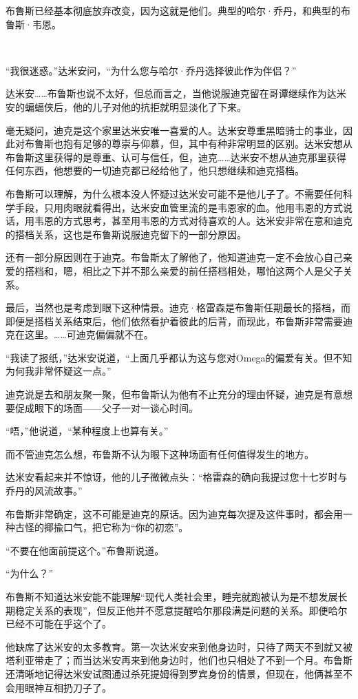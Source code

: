 \documentclass[../main]{subfiles}
\begin{document}
布鲁斯已经基本彻底放弃改变，因为这就是他们。典型的哈尔·乔丹，和典型的布鲁斯·韦恩。

~\

“我很迷惑。”达米安问，“为什么您与哈尔·乔丹选择彼此作为伴侣？”

达米安……布鲁斯也说不太好，但总而言之，当他说服迪克留在哥谭继续作为达米安的蝙蝠侠后，他的儿子对他的抗拒就明显淡化了下来。

毫无疑问，迪克是这个家里达米安唯一喜爱的人。达米安尊重黑暗骑士的事业，因此对布鲁斯也抱有足够的尊崇与仰慕，但，其中有种非常明显的区别。达米安想从布鲁斯这里获得的是尊重、认可与信任，但，迪克……达米安不想从迪克那里获得任何东西，他想要的一切迪克都已经给他了，他只想继续和迪克搭档。

布鲁斯可以理解，为什么根本没人怀疑过达米安可能不是他儿子了。不需要任何科学手段，只用肉眼就看得出，达米安血管里流的是韦恩家的血。他用韦恩的方式说话，用韦恩的方式思考，甚至用韦恩的方式对待喜欢的人。达米安非常在意和迪克的搭档关系，这也是布鲁斯说服迪克留下的一部分原因。

还有一部分原因则在于迪克。布鲁斯太了解他了，他知道迪克一定不会放心自己亲爱的搭档和，嗯，相比之下并不那么亲爱的前任搭档相处，哪怕这两个人是父子关系。

最后，当然也是考虑到眼下这种情景。迪克·格雷森是布鲁斯任期最长的搭档，而即便是搭档关系结束后，他们依然看护着彼此的后背，而现此，布鲁斯非常需要迪克在这里。……可迪克偏偏就不在。

“我读了报纸，”达米安说道，“上面几乎都认为这与您对Omega的偏爱有关。但不知为何我非常怀疑这一点。”

迪克说是去和朋友聚一聚，但布鲁斯认为他有不止充分的理由怀疑，迪克是有意想要促成眼下的场面——父子一对一谈心时间。

“唔，”他说道，“某种程度上也算有关。”

而不管迪克怎么想，布鲁斯不认为眼下这种场面有任何值得发生的地方。

达米安看起来并不惊讶，他的儿子微微点头：“格雷森的确向我提过您十七岁时与乔丹的风流故事。”

布鲁斯非常确定，这不可能是迪克的原话。因为迪克每次提及这件事时，都会用一种古怪的揶揄口气，把它称为“你的初恋”。

“不要在他面前提这个。”布鲁斯说道。

“为什么？”

布鲁斯不知道达米安能不能理解“现代人类社会里，睡完就跑被认为是不想发展长期稳定关系的表现”，但反正他并不愿意提醒哈尔那段满是问题的关系。即便哈尔已经不可能在乎这个了。

他缺席了达米安的太多教育。第一次达米安来到他身边时，只待了两天不到就又被塔利亚带走了；而当达米安再来到他身边时，他们也只相处了不到一个月。布鲁斯还清晰地记得达米安试图通过杀死提姆得到罗宾身份的情景，但现在，他俩甚至不会用眼神互相扔刀子了。
\end{document}
